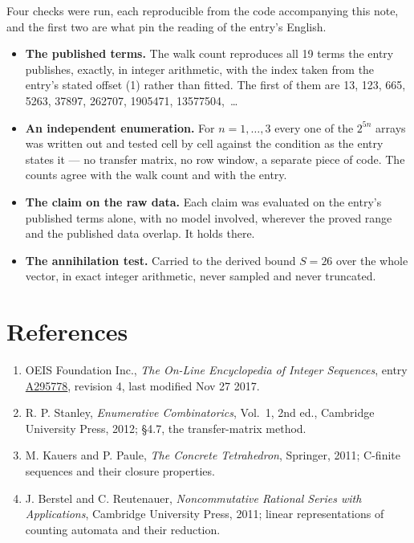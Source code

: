 \documentclass[11pt]{article}
\theoremstyle{definition}
\begin{document}
Four checks were run, each reproducible from the code accompanying this note, and the first two are what pin the reading of the entry's English.

\begin{itemize}

\item {\bfseries The published terms.} The walk count reproduces all 19 terms the entry publishes, exactly, in integer arithmetic, with the index taken from the entry's stated offset (1) rather than fitted. The first of them are 13, 123, 665, 5263, 37897, 262707, 1905471, 13577504,~\dots

\item {\bfseries An independent enumeration.} For $n = 1,\dots,3$ every one of the $2^{5n}$ arrays was written out and tested cell by cell against the condition as the entry states it --- no transfer matrix, no row window, a separate piece of code. The counts agree with the walk count and with the entry.

\item {\bfseries The claim on the raw data.} Each claim was evaluated on the entry's published terms alone, with no model involved, wherever the proved range and the published data overlap. It holds there.

\item {\bfseries The annihilation test.} Carried to the derived bound $S = 26$ over the whole vector, in exact integer arithmetic, never sampled and never truncated.

\end{itemize}

\section{References}

\begin{enumerate}

\item OEIS Foundation Inc., \emph{The On-Line Encyclopedia of Integer Sequences}, entry \href{https://oeis.org/A295778}{A295778}, revision 4, last modified Nov 27 2017.

\item R. P. Stanley, \emph{Enumerative Combinatorics}, Vol.~1, 2nd ed., Cambridge University Press, 2012; \S4.7, the transfer-matrix method.

\item M. Kauers and P. Paule, \emph{The Concrete Tetrahedron}, Springer, 2011; C-finite sequences and their closure properties.

\item J. Berstel and C. Reutenauer, \emph{Noncommutative Rational Series with Applications}, Cambridge University Press, 2011; linear representations of counting automata and their reduction.

\end{enumerate}
\end{document}
